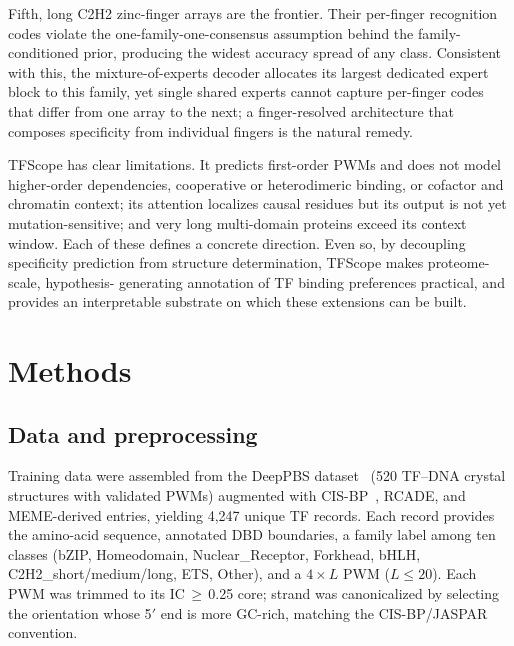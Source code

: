 \documentclass[11pt,letterpaper]{article}
\begin{document}
Fifth, long C2H2 zinc-finger arrays are the frontier. Their per-finger recognition
codes violate the one-family-one-consensus assumption behind the family-conditioned
prior, producing the widest accuracy spread of any class. Consistent with this, the
mixture-of-experts decoder allocates its largest dedicated expert block to this
family, yet single shared experts cannot capture per-finger codes that differ from
one array to the next; a finger-resolved architecture that composes specificity from
individual fingers is the natural remedy.

TFScope has clear limitations. It predicts first-order PWMs and does not model
higher-order dependencies, cooperative or heterodimeric binding, or cofactor and
chromatin context; its attention localizes causal residues but its output is not yet
mutation-sensitive; and very long multi-domain proteins exceed its context window.
Each of these defines a concrete direction. Even so, by decoupling specificity
prediction from structure determination, TFScope makes proteome-scale, hypothesis-
generating annotation of TF binding preferences practical, and provides an
interpretable substrate on which these extensions can be built.

\section*{Methods}

\subsection*{Data and preprocessing}
Training data were assembled from the DeepPBS dataset~\cite{Mitra2024} (520
TF--DNA crystal structures with validated PWMs) augmented with
CIS-BP~\cite{Weirauch2014}, RCADE, and MEME-derived entries, yielding 4,247 unique
TF records. Each record provides the amino-acid sequence, annotated DBD boundaries,
a family label among ten classes (bZIP, Homeodomain, Nuclear\_Receptor, Forkhead,
bHLH, C2H2\_short/medium/long, ETS, Other), and a $4\times L$ PWM ($L\leq20$). Each
PWM was trimmed to its IC\,$\geq$\,0.25 core; strand was canonicalized by selecting
the orientation whose 5$'$ end is more GC-rich, matching the
CIS-BP/JASPAR~\cite{CastroMondragon2022} convention.
\end{document}

